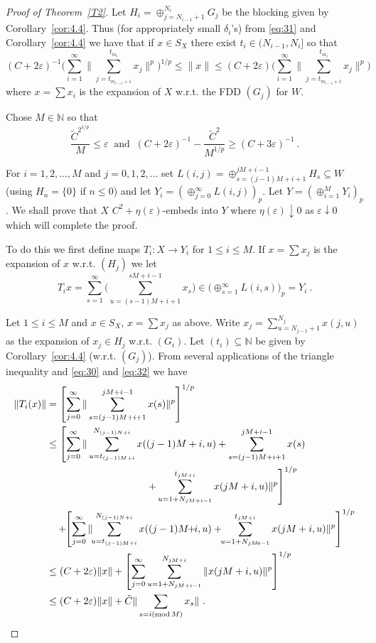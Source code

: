 \documentclass[11pt,leqno]{amsart}
\theoremstyle{definition}
\def\mod{\mathop{\rm mod}\nolimits}
\newcommand{\vp}{\varepsilon}
\newcommand{\tC}{\tilde C}
\newcommand{\N}{\mathbb{N}}
\begin{document}
\begin{proof}[Proof of Theorem~\ref{T2}]
Let $H_i = \oplus_{j=N_{i-1}+1}^{N_i} G_j$ be the blocking given 
by Corollary~\ref{cor:4.4}. 
Thus (for appropriately small $\delta_i$'s) from \eqref{eq:31} 
and Corollary~\ref{cor:4.4} we have that  if $x\in S_X$ there exist 
$t_i \in (N_{i-1},N_i]$ so that 
\begin{equation}\label{eq:32}
(C+2\vp)^{-1}\biggl( \sum_{i=1}^\infty \Big\|\sum_{j=t_{m_{i-1}+1}}^{t_{m_i}}
x_j\Big\|^p\biggr)^{1/p} 
\le \|x\| 
\le (C+2\vp) \biggl( \sum_{i=1}^\infty 
\Big\| \sum_{j=t_{m_{i-1}+1}}^{t_{m_i}} x_j\Big\|^p\biggr)
\end{equation}
where $x=\sum x_i$ is the expansion of $X$ w.r.t. the FDD $(G_j)$ for $W$.

Chose $M\in\N$ so that 
\begin{equation}\label{eq:33}
\frac{\tilde C^{2^{1/p}}}M \le \vp\ \text{ and }\  
(C+2\vp)^{-1} - \frac{\tilde C^2}{M^{1/p}} \ge (C+3\vp)^{-1}\ .
\end{equation}

For $i=1,2,\ldots,M$ and $j=0,1,2,\ldots$ set 
$L(i,j) = \oplus_{s= (j-1)M+i+1}^{jM+i-1} H_s \subseteq W$ 
(using $H_n = \{0\}$ if $n\le0$) and let 
$Y_i = (\oplus_{j=0}^\infty L(i,j))_p$. 
Let $Y = (\oplus_{i=1}^M Y_i)_p$. 
We shall prove that $X$ $C^2 +\eta (\vp)$-embeds into $Y$ where $\eta (\vp) 
\downarrow0$ as $\vp\downarrow0$ which will complete the proof.

To do this we first define maps $T_i :X\to Y_i$ for $1\le i\le M$. 
If $x=\sum x_j$ is the expansion of $x$ w.r.t. $(H_j)$ we let 
$$T_i x = \sum_{s=1}^\infty 
\biggl( \sum_{u=(s-1)M+i+1}^{sM+i-1} x_s\biggr) 
\in \biggl( \oplus_{s=1}^\infty L(i,s)\biggr)_p 
= Y_i\ .$$

Let $1\le i\le M$ and $x\in S_X$, $x= \sum x_j$ as above. 
Write $x_j = \sum_{u=N_{j-1}+1}^{N_j} x(j,u)$ as the expansion of $x_j\in H_j$ 
w.r.t. $(G_i)$. 
Let $(t_i) \subseteq \N$ be given by Corollary~\ref{cor:4.4} 
(w.r.t. $(G_j)$). 
{From} several applications of the triangle inequality and 
\eqref{eq:30} and \eqref{eq:32} we have 
\begin{align*}
\|T_i(x)\|&=\left[\sum_{j=0}^\infty \|\sum_{s=(j-1)M+i+1}^{jM+i-1}
x(s)\|^p\right]^{1/p}\\
&\le\left[\sum_{j=0}^\infty
\|\sum_{u=t_{(j-1)M+i}}^{N_{(j-1)N+i}}
x((j-1)M+i,u)+\sum_{s=(j-1)M+i+1}^{jM+i-1} x(s)\right.\\
&\qquad\qquad\qquad\qquad\qquad\left.+\sum_{u=1+N_{jM+i-1}}^{t_{jM+i}}
x(jM+i,u)\|^p\right]^{1/p}\\
&\quad+\!\!\left[\sum_{j=0}^\infty
\|\!\!\sum_{u=t_{(j-1)M+i}}^{N_{(j-1)N+i}} x((j-1)M\!\!+\!\!i,u)
+\!\!\sum_{u=1+N_{jM\!\!+\!\!i-1}}^{t_{jM+i}}
x(jM+i,u)\|^p\right]^{1/p}\\
&\le (C+2\vp)\|x\|+ \left[\sum_{j=0}^\infty \sum_{u=1+N_{jM+i-1}}^{N_{jM+i}}
\|x(jM+i,u)\|^p \right]^{1/p}\\
&\le (C+2\vp)\|x\|+\tC\|\sum_{s=i(\mod M)} x_s\|\ .
\end{align*}


\end{proof}
\end{document}
